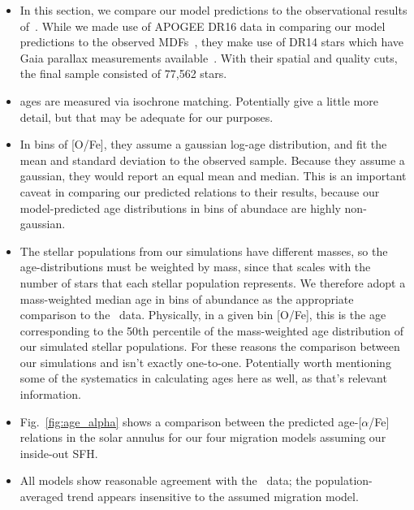 \documentclass[fleqn, usenatbib]{mnras}
\begin{document}
\begin{itemize} 
	\item In this section, we compare our model predictions to the 
	observational results of~\citet{Feuillet2019}. While we made use of 
	APOGEE DR16 data in comparing our model predictions to the observed 
	MDFs~\citep{Ahumada2020, Majewski2017}, they make use of DR14 stars which 
	have Gaia parallax measurements available~\citep[][for details on the 
	APOGEE survey, see discussion in~\S~\ref{sec:comp_obs:mdfs}]{Abolfathi2014, 
	GaiaDR2}. With their spatial and quality cuts, the final sample consisted 
	of 77,562 stars. 

	\item \citet{Feuillet2019} ages are measured via isochrone matching. 
	{\color{red} Potentially give a little more detail, but that may be 
	adequate for our purposes.} 

	\item In bins of [O/Fe], they assume a gaussian log-age distribution, and 
	fit the mean and standard deviation to the observed sample. Because they 
	assume a gaussian, they would report an equal mean and median. This is an 
	important caveat in comparing our predicted relations to their results, 
	because our model-predicted age distributions in bins of abundace are 
	highly non-gaussian. 

	\item The stellar populations from our simulations have different masses, 
	so the age-distributions must be weighted by mass, since that scales with 
	the number of stars that each stellar population represents. We therefore 
	adopt a mass-weighted median age in bins of abundance as the appropriate 
	comparison to the~\citet{Feuillet2019} data. Physically, in a given bin 
	[O/Fe], this is the age corresponding to the 50th percentile of the 
	mass-weighted age distribution of our simulated stellar populations. For 
	these reasons the comparison between our simulations and 
	\citet{Feuillet2019} isn't exactly one-to-one. {\color{red} Potentially 
	worth mentioning some of the systematics in calculating ages here as 
	well, as that's relevant information.} 

	\item Fig.~\ref{fig:age_alpha} shows a comparison 
	between the predicted age-[$\alpha$/Fe] relations in the solar annulus for 
	our four migration models assuming our inside-out SFH. 

	\item All models show reasonable agreement with the~\citet{Feuillet2019} 
	data; the population-averaged trend appears insensitive to the assumed 
	migration model. 


\end{itemize}
\end{document}
